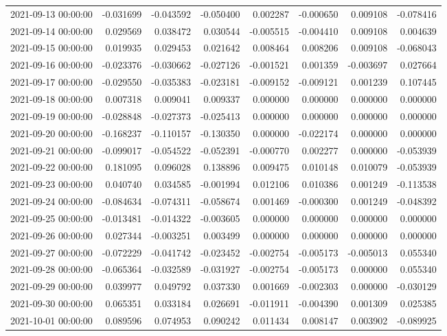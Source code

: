 \begin{tabular}{lrrrrrrr}
2021-09-13 00:00:00 & -0.031699 & -0.043592 & -0.050400 & 0.002287 & -0.000650 & 0.009108 & -0.078416 \\
2021-09-14 00:00:00 & 0.029569 & 0.038472 & 0.030544 & -0.005515 & -0.004410 & 0.009108 & 0.004639 \\
2021-09-15 00:00:00 & 0.019935 & 0.029453 & 0.021642 & 0.008464 & 0.008206 & 0.009108 & -0.068043 \\
2021-09-16 00:00:00 & -0.023376 & -0.030662 & -0.027126 & -0.001521 & 0.001359 & -0.003697 & 0.027664 \\
2021-09-17 00:00:00 & -0.029550 & -0.035383 & -0.023181 & -0.009152 & -0.009121 & 0.001239 & 0.107445 \\
2021-09-18 00:00:00 & 0.007318 & 0.009041 & 0.009337 & 0.000000 & 0.000000 & 0.000000 & 0.000000 \\
2021-09-19 00:00:00 & -0.028848 & -0.027373 & -0.025413 & 0.000000 & 0.000000 & 0.000000 & 0.000000 \\
2021-09-20 00:00:00 & -0.168237 & -0.110157 & -0.130350 & 0.000000 & -0.022174 & 0.000000 & 0.000000 \\
2021-09-21 00:00:00 & -0.099017 & -0.054522 & -0.052391 & -0.000770 & 0.002277 & 0.000000 & -0.053939 \\
2021-09-22 00:00:00 & 0.181095 & 0.096028 & 0.138896 & 0.009475 & 0.010148 & 0.010079 & -0.053939 \\
2021-09-23 00:00:00 & 0.040740 & 0.034585 & -0.001994 & 0.012106 & 0.010386 & 0.001249 & -0.113538 \\
2021-09-24 00:00:00 & -0.084634 & -0.074311 & -0.058674 & 0.001469 & -0.000300 & 0.001249 & -0.048392 \\
2021-09-25 00:00:00 & -0.013481 & -0.014322 & -0.003605 & 0.000000 & 0.000000 & 0.000000 & 0.000000 \\
2021-09-26 00:00:00 & 0.027344 & -0.003251 & 0.003499 & 0.000000 & 0.000000 & 0.000000 & 0.000000 \\
2021-09-27 00:00:00 & -0.072229 & -0.041742 & -0.023452 & -0.002754 & -0.005173 & -0.005013 & 0.055340 \\
2021-09-28 00:00:00 & -0.065364 & -0.032589 & -0.031927 & -0.002754 & -0.005173 & 0.000000 & 0.055340 \\
2021-09-29 00:00:00 & 0.039977 & 0.049792 & 0.037330 & 0.001669 & -0.002303 & 0.000000 & -0.030129 \\
2021-09-30 00:00:00 & 0.065351 & 0.033184 & 0.026691 & -0.011911 & -0.004390 & 0.001309 & 0.025385 \\
2021-10-01 00:00:00 & 0.089596 & 0.074953 & 0.090242 & 0.011434 & 0.008147 & 0.003902 & -0.089925 \\

\end{tabular}
